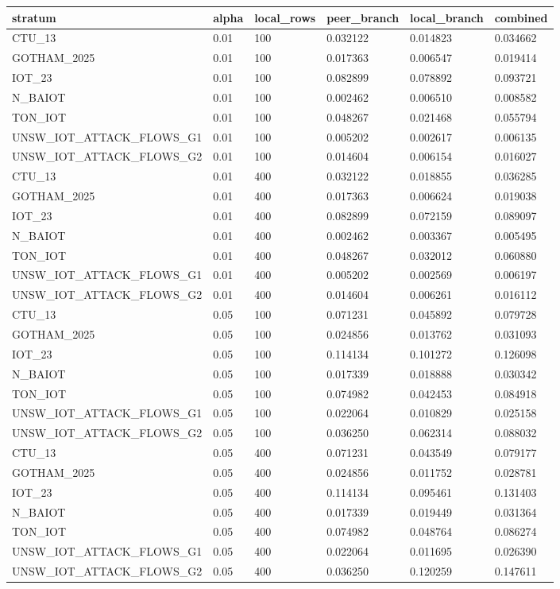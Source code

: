\begin{tabular}{llllll}
\toprule
stratum & alpha & local\_rows & peer\_branch & local\_branch & combined \\
\midrule
CTU\_13 & 0.01 & 100 & 0.032122 & 0.014823 & 0.034662 \\
GOTHAM\_2025 & 0.01 & 100 & 0.017363 & 0.006547 & 0.019414 \\
IOT\_23 & 0.01 & 100 & 0.082899 & 0.078892 & 0.093721 \\
N\_BAIOT & 0.01 & 100 & 0.002462 & 0.006510 & 0.008582 \\
TON\_IOT & 0.01 & 100 & 0.048267 & 0.021468 & 0.055794 \\
UNSW\_IOT\_ATTACK\_FLOWS\_G1 & 0.01 & 100 & 0.005202 & 0.002617 & 0.006135 \\
UNSW\_IOT\_ATTACK\_FLOWS\_G2 & 0.01 & 100 & 0.014604 & 0.006154 & 0.016027 \\
CTU\_13 & 0.01 & 400 & 0.032122 & 0.018855 & 0.036285 \\
GOTHAM\_2025 & 0.01 & 400 & 0.017363 & 0.006624 & 0.019038 \\
IOT\_23 & 0.01 & 400 & 0.082899 & 0.072159 & 0.089097 \\
N\_BAIOT & 0.01 & 400 & 0.002462 & 0.003367 & 0.005495 \\
TON\_IOT & 0.01 & 400 & 0.048267 & 0.032012 & 0.060880 \\
UNSW\_IOT\_ATTACK\_FLOWS\_G1 & 0.01 & 400 & 0.005202 & 0.002569 & 0.006197 \\
UNSW\_IOT\_ATTACK\_FLOWS\_G2 & 0.01 & 400 & 0.014604 & 0.006261 & 0.016112 \\
CTU\_13 & 0.05 & 100 & 0.071231 & 0.045892 & 0.079728 \\
GOTHAM\_2025 & 0.05 & 100 & 0.024856 & 0.013762 & 0.031093 \\
IOT\_23 & 0.05 & 100 & 0.114134 & 0.101272 & 0.126098 \\
N\_BAIOT & 0.05 & 100 & 0.017339 & 0.018888 & 0.030342 \\
TON\_IOT & 0.05 & 100 & 0.074982 & 0.042453 & 0.084918 \\
UNSW\_IOT\_ATTACK\_FLOWS\_G1 & 0.05 & 100 & 0.022064 & 0.010829 & 0.025158 \\
UNSW\_IOT\_ATTACK\_FLOWS\_G2 & 0.05 & 100 & 0.036250 & 0.062314 & 0.088032 \\
CTU\_13 & 0.05 & 400 & 0.071231 & 0.043549 & 0.079177 \\
GOTHAM\_2025 & 0.05 & 400 & 0.024856 & 0.011752 & 0.028781 \\
IOT\_23 & 0.05 & 400 & 0.114134 & 0.095461 & 0.131403 \\
N\_BAIOT & 0.05 & 400 & 0.017339 & 0.019449 & 0.031364 \\
TON\_IOT & 0.05 & 400 & 0.074982 & 0.048764 & 0.086274 \\
UNSW\_IOT\_ATTACK\_FLOWS\_G1 & 0.05 & 400 & 0.022064 & 0.011695 & 0.026390 \\
UNSW\_IOT\_ATTACK\_FLOWS\_G2 & 0.05 & 400 & 0.036250 & 0.120259 & 0.147611 \\
\bottomrule
\end{tabular}
